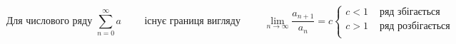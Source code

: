 
$$
{\text{ Для числового ряду }}
\sum_{n=0}^{\infty} a
\qquad
{\text{ існує границя вигляду }}
\qquad
\lim_{n \to \infty} \dfrac{a_{n+1}}{a_n} = c
\begin{cases}
  c < 1    & {\text{ ряд збігається }} \\
  c > 1    & {\text{ ряд розбігається}} \\
\end{cases}
$$
